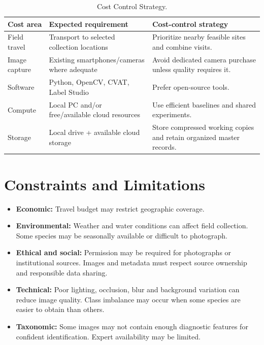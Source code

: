 \documentclass[12pt,a4paper]{article}
\begin{document}
\begin{table}[H]
\centering
\caption{Cost Control Strategy.}
\small
\begin{tabularx}{\textwidth}{|p{1.2in}|X|X|}
\hline
\textbf{Cost area} & \textbf{Expected requirement} & \textbf{Cost-control strategy} \\
\hline
Field travel & Transport to selected collection locations & Prioritize nearby feasible sites and combine visits. \\
\hline
Image capture & Existing smartphones/cameras where adequate & Avoid dedicated camera purchase unless quality requires it. \\
\hline
Software & Python, OpenCV, CVAT, Label Studio & Prefer open-source tools. \\
\hline
Compute & Local PC and/or free/available cloud resources & Use efficient baselines and shared experiments. \\
\hline
Storage & Local drive + available cloud storage & Store compressed working copies and retain organized master records. \\
\hline
\end{tabularx}
\end{table}


\section{Constraints and Limitations}

\begin{itemize}[leftmargin=0.35in]
    \item \textbf{Economic:} Travel budget may restrict geographic coverage.
    \item \textbf{Environmental:} Weather and water conditions can affect field collection. Some species may be seasonally available or difficult to photograph.
    \item \textbf{Ethical and social:} Permission may be required for photographs or institutional sources. Images and metadata must respect source ownership and responsible data sharing.
    \item \textbf{Technical:} Poor lighting, occlusion, blur and background variation can reduce image quality. Class imbalance may occur when some species are easier to obtain than others.
    \item \textbf{Taxonomic:} Some images may not contain enough diagnostic features for confident identification. Expert availability may be limited.
\end{itemize}
\end{document}

